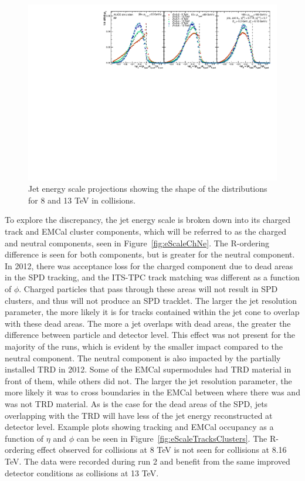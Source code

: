 \begin{figure}[hbt!]
    \centering
    \includegraphics[width=\textwidth]{figures/EnergyScale/ROrdering/JetEscaleProj_3_EnergyComp.pdf}
    \caption{Jet energy scale projections showing the shape of the distributions for 8 and 13 TeV in \pp collisions.}
    \label{fig:eScaleShapeWidth}
\end{figure}

To explore the discrepancy, the jet energy scale is broken down into its charged track and EMCal cluster components, which will be referred to as the charged and neutral components, seen in Figure~\ref{fig:eScaleChNe}. The R-ordering difference is seen for both components, but is greater for the neutral component. In 2012, there was acceptance loss for the charged component due to dead areas in the SPD tracking, and the ITS-TPC track matching was different as a function of $\phi$. Charged particles that pass through these areas will not result in SPD clusters, and thus will not produce an SPD tracklet. The larger the jet resolution parameter, the more likely it is for tracks contained within the jet cone to overlap with these dead areas. The more a jet overlaps with dead areas, the greater the difference between particle and detector level. This effect was not present for the majority of the runs, which is evident by the smaller impact compared to the neutral component. The neutral component is also impacted by the partially installed TRD in 2012. Some of the EMCal supermodules had TRD material in front of them, while others did not. The larger the jet resolution parameter, the more likely it was to cross boundaries in the EMCal between where there was and was not TRD material. As is the case for the dead areas of the SPD, jets overlapping with the TRD will have less of the jet energy reconstructed at detector level. Example plots showing tracking and EMCal occupancy as a function of $\eta$ and $\phi$ can be seen in Figure~\ref{fig:eScaleTracksClusters}. The R-ordering effect observed for \pp collisions at 8 TeV is not seen for \pPb collisions at 8.16 TeV. The \pPb data were recorded during run 2 and benefit from the same improved detector conditions as \pp collisions at 13 TeV.


